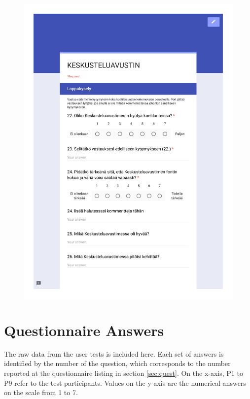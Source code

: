 \documentclass[english, 12pt, a4paper, pdftex, elec, utf8]{aaltothesis}
\begin{document}
\begin{figure}
    \centering
    \includegraphics[page=3,trim={1cm 0cm 1cm 0cm}, clip, width=\textwidth]{q4.pdf}
\end{figure}

\section{Questionnaire Answers} \label{sec:answers}

The raw data from the user tests is included here. Each set of answers is identified by the number of the question, which corresponds to the number reported at the questionnaire listing in section \ref{sec:quest}. On the x-axis, P1 to P9 refer to the test participants. Values on the y-axis are the numerical answers on the scale from 1 to 7.
\end{document}
